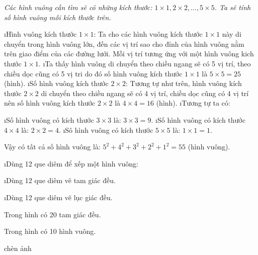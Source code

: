 \begin{Answer}{65}
		\textit{Các hình vuông cần tìm sẽ có những kích thước: $1\times 1, 2\times 2,\ldots, 5\times5$. Ta sẽ tính số hình vuông mỗi kích thước trên.}
		\begin{enumerate}[--, leftmargin=*]
			\i Hình vuông kích thước  $1\times 1$: Ta cho các hình vuông kích thước $1\times 1$  này di chuyển trong hình vuông lớn, đến các vị trí sao cho đỉnh của hình vuông nằm trên giao điểm của các đường lưới. Mỗi vị trí tương ứng với một hình vuông kich thước $ 1\times 1$.
			\i Ta thấy hình vuông di chuyển theo chiều ngang sẽ có 5 vị trí, theo chiều dọc cũng có 5 vị tri do đó số hình vuông kích thước $1\times 1$  là $5 \times 5 = 25$ (hình).
			\i Số hình vuông kích thước  $2 \times 2$: Tương tự như trên, hình vuông kích thước $2 \times 2$  di chuyển theo chiều ngang sẽ có 4 vị trí, chiều dọc cũng có 4 vị trí nên số hình vuông kích thước $2 \times 2$  là $4 \times 4 = 16$  (hình).
			\i Tương tự ta có:
			\begin{enumerate}[+, leftmargin=*]
				\i Số hình vuông có kích thước $3 \times 3$ là: $3\times 3 = 9$.
				\i Số hình vuông có kích thước $4 \times 4$ là: $2 \times 2 = 4$.
				\i Sô hình vuông có kích thước $5 \times 5$ là: $1 \times 1 = 1$.
			\end{enumerate}
		\end{enumerate}
		Vậy có tất cả số hình vuông là: $5^2 + 4^2 + 3^2 +2^2 + 1^2 = 55$ (hình vuông).
	
\end{Answer}
\begin{Answer}{66}
		\begin{enumerate}[a), leftmargin=*]
			\i Dùng 12 que diêm để xếp một hình vuông:
			
			\i Dùng 12 que diêm vẽ tam giác đều.
			
			\i Dùng 12 que diêm vẽ lục giác đều.
		\end{enumerate}
	
\end{Answer}
\begin{Answer}{67}
		Trong hình có 20 tam giác đều.
	
\end{Answer}
\begin{Answer}{68}
		Trong hình có 10 hình vuông.
	
\end{Answer}
\begin{Answer}{69}
		chèn ảnh
	
\end{Answer}
